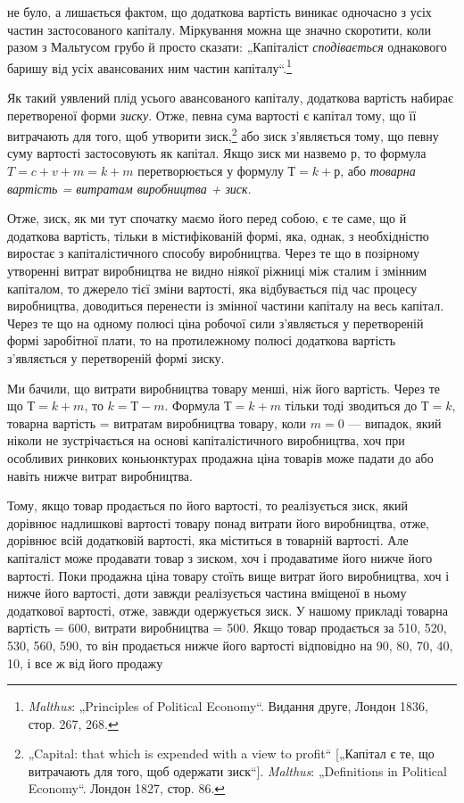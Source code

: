 \parcont{}  %
не було, а лишається фактом, що додаткова вартість виникає одночасно
з усіх частин застосованого капіталу. Міркування можна
ще значно скоротити, коли разом з Мальтусом грубо й просто
сказати: „Капіталіст \emph{сподівається} однакового баришу від усіх
авансованих ним частин капіталу“.\footnote{
\emph{Malthus}: „Principles of Political Economy“. Видання друге, Лондон 1836,
стор. 267, 268.
}

Як такий уявлений плід усього авансованого капіталу, додаткова
вартість набирає перетвореної форми \emph{зиску}. Отже, певна
сума вартості є капітал тому, що її витрачають для того, щоб
утворити зиск,\footnote{
„Capital: that which is expended with a view to profit“ [„Капітал є те, що
витрачають для того, щоб одержати зиск“]. \emph{Malthus}: „Definitions in Political
Economy“. Лондон 1827, стор. 86.
} або зиск з’являється тому, що певну суму вартості
застосовують як капітал. Якщо зиск ми назвемо $р$, то формула
$T = c + v + m = k + m$ перетворюється у формулу $Т = k + р$, або
\emph{товарна вартість = витратам виробництва + зиск}.

Отже, зиск, як ми тут спочатку маємо його перед собою,
є те саме, що й додаткова вартість, тільки в містифікованій
формі, яка, однак, з необхідністю виростає з капіталістичного
способу виробництва. Через те що в позірному утворенні витрат
виробництва не видно ніякої ріжниці між сталим і змінним
капіталом, то джерело тієї зміни вартості, яка відбувається
під час процесу виробництва, доводиться перенести із змінної
частини капіталу на весь капітал. Через те що на одному полюсі
ціна робочої сили з’являється у перетвореній формі заробітної
плати, то на протилежному полюсі додаткова вартість з’являється
у перетвореній формі зиску.

Ми бачили, що витрати виробництва товару менші, ніж його
вартість. Через те що $Т = k + m$, то $k = Т - m$. Формула
$Т = k + m$ тільки тоді зводиться до $Т = k$, товарна вартість =
витратам виробництва товару, коли $m = 0$ — випадок, який
ніколи не зустрічається на основі капіталістичного виробництва,
хоч при особливих ринкових коньюнктурах продажна ціна товарів
може падати до або навіть нижче витрат виробництва.

Тому, якщо товар продається по його вартості, то реалізується
зиск, який дорівнює надлишкові вартості товару понад витрати
його виробництва, отже, дорівнює всій додатковій вартості, яка
міститься в товарній вартості. Але капіталіст може продавати
товар з зиском, хоч і продаватиме його нижче його вартості.
Поки продажна ціна товару стоїть вище витрат його виробництва,
хоч і нижче його вартості, доти завжди реалізується
частина вміщеної в ньому додаткової вартості, отже, завжди
одержується зиск. У нашому прикладі товарна вартість = 600, витрати виробництва = 500.
Якщо товар продається за 510, 520, 530, 560, 590, то він продається нижче його вартості відповідно на
90, 80, 70, 40, 10, і все ж від його продажу
\parbreak{}  %
